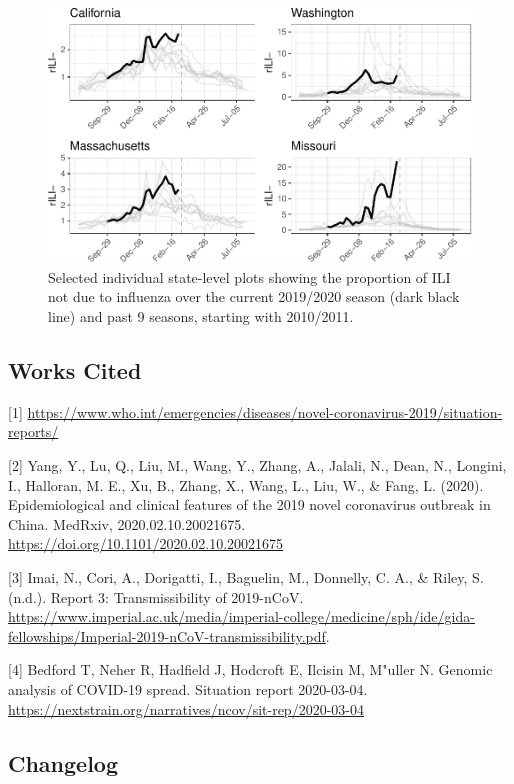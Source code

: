 \documentclass[]{article}
\begin{document}
\begin{figure}
\centering
\includegraphics{ili-labtest-report_files/figure-latex/get-sd-data-1.pdf}
\caption{Selected individual state-level plots showing the proportion of
ILI not due to influenza over the current 2019/2020 season (dark black
line) and past 9 seasons, starting with 2010/2011.}
\end{figure}

\hypertarget{works-cited}{%
\subsection{Works Cited}\label{works-cited}}

{[}1{]}
\url{https://www.who.int/emergencies/diseases/novel-coronavirus-2019/situation-reports/}

{[}2{]} Yang, Y., Lu, Q., Liu, M., Wang, Y., Zhang, A., Jalali, N.,
Dean, N., Longini, I., Halloran, M. E., Xu, B., Zhang, X., Wang, L.,
Liu, W., \& Fang, L. (2020). Epidemiological and clinical features of
the 2019 novel coronavirus outbreak in China. MedRxiv,
2020.02.10.20021675. \url{https://doi.org/10.1101/2020.02.10.20021675}

{[}3{]} Imai, N., Cori, A., Dorigatti, I., Baguelin, M., Donnelly, C.
A., \& Riley, S. (n.d.). Report 3: Transmissibility of 2019-nCoV.
\url{https://www.imperial.ac.uk/media/imperial-college/medicine/sph/ide/gida-fellowships/Imperial-2019-nCoV-transmissibility.pdf}.

{[}4{]} Bedford T, Neher R, Hadfield J, Hodcroft E, Ilcisin M, M"uller
N. Genomic analysis of COVID-19 spread. Situation report 2020-03-04.
\url{https://nextstrain.org/narratives/ncov/sit-rep/2020-03-04}

\clearpage

\hypertarget{changelog}{%
\subsection{Changelog}\label{changelog}}
\end{document}
